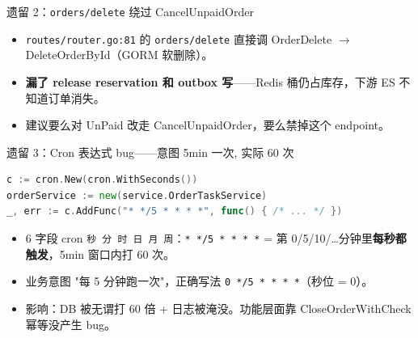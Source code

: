 \begin{frame}{遗留 2：\texttt{orders/delete} 绕过 CancelUnpaidOrder}
\vspace{1mm}
\begin{itemize}
  \item \texttt{routes/router.go:81} 的 \texttt{orders/delete} 直接调 OrderDelete $\to$ DeleteOrderById（GORM 软删除）。
  \item \textbf{漏了 release reservation 和 outbox 写}——Redis 桶仍占库存，下游 ES 不知道订单消失。
  \item 建议要么对 UnPaid 改走 CancelUnpaidOrder，要么禁掉这个 endpoint。
\end{itemize}
\end{frame}

\begin{frame}[fragile]{遗留 3：Cron 表达式 bug——意图 5min 一次, 实际 60 次}
\begin{lstlisting}[language=Go,firstnumber=14,
  caption={initialize/cron.go:14--16 触发表达式},captionpos=b]
c := cron.New(cron.WithSeconds())
orderService := new(service.OrderTaskService)
_, err := c.AddFunc("* */5 * * * *", func() { /* ... */ })
\end{lstlisting}
\begin{itemize}
  \item 6 字段 cron \texttt{秒 分 时 日 月 周}：\texttt{* */5 * * * *} = 第 0/5/10/\dots 分钟里\textbf{每秒都触发}，5min 窗口内打 60 次。
  \item 业务意图 "每 5 分钟跑一次"，正确写法 \texttt{0 */5 * * * *}（秒位 = 0）。
  \item 影响：DB 被无谓打 60 倍 + 日志被淹没。功能层面靠 CloseOrderWithCheck 幂等没产生 bug。
\end{itemize}
\end{frame}


